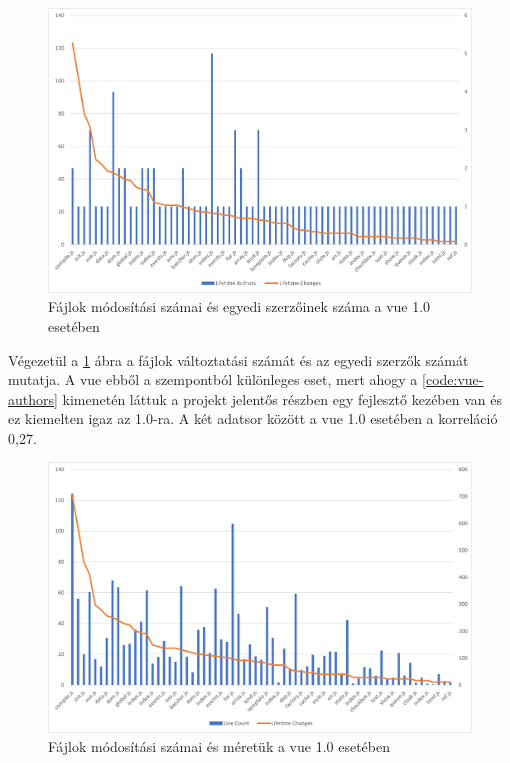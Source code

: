 \begin{figure}[H]
    \centering
    \includegraphics[width=1\textwidth]{images/vue/vue1-lifetimechanges-authors.png}
    \caption{Fájlok módosítási számai és egyedi szerzőinek száma a vue 1.0 esetében}
    \label{fig:vue1-changes-authors}
\end{figure}

Végezetül a \ref{fig:vue1-changes-authors} ábra a fájlok változtatási számát és az egyedi szerzők számát mutatja. A vue ebből a szempontból különleges eset, mert ahogy a \ref{code:vue-authors} kimenetén láttuk a projekt jelentős részben egy fejlesztő kezében van és ez kiemelten igaz az 1.0-ra. A két adatsor között a vue 1.0 esetében a korreláció 0,27.

\begin{figure}[H]
    \centering
    \includegraphics[width=1\textwidth]{images/vue/vue1-lines-lifetimechanges.png}
    \caption{Fájlok módosítási számai és méretük a vue 1.0 esetében}
    \label{fig:vue1-changes-lines}
\end{figure}

